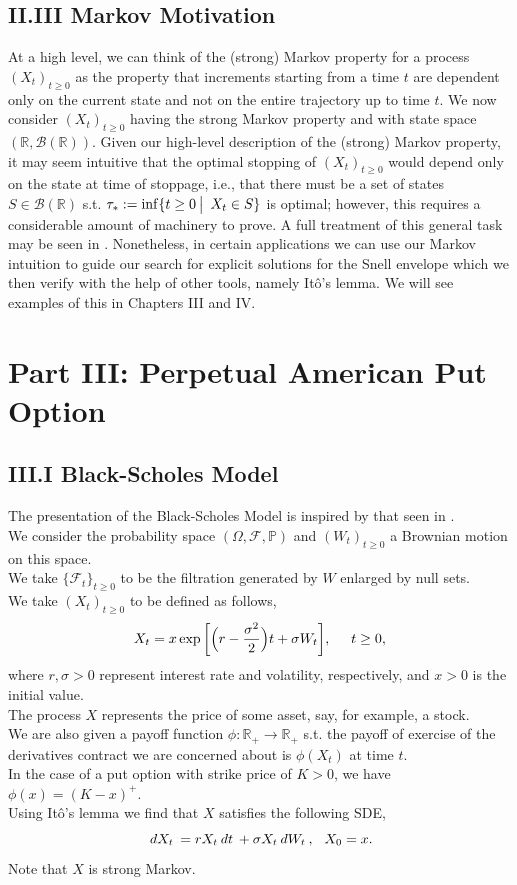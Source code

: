 \documentclass[12pt]{article}
\newcommand{\cB}{\mathcal{B}}
\newcommand{\cF}{\mathcal{F}}
\newcommand{\R}{\mathbb{R}}
\newcommand{\Prb}{\mathbb{P}}
\newcommand{\quantifyspace}{\hspace{2px} \big | \hspace{5px}}
\newcommand{\df}[1]{\hspace{2 px} d #1 \hspace{2 px}}
\newcommand{\PS}{(\Omega, \cF, \Prb)}
\newcommand{\cFi}{\{\cF_t\}_{t \geq 0}}
\newcommand{\spc}{\hspace{7 px}}
\theoremstyle{definition}
\begin{document}
\subsection*{\quad II.III Markov Motivation}\label{sec:II.III}
At a high level, we can think of the (strong) Markov property for a process $(X_t)_{t \geq 0}$ as the property that increments starting from a time $t$ are dependent only on the current state and not on the entire trajectory up to time $t$.
We now consider $(X_t)_{t \geq 0}$ having the strong Markov property and with state space $(\R, \cB(\R))$.
Given our high-level description of the (strong) Markov property, it may seem intuitive that the optimal stopping of $(X_t)_{t \geq 0}$ would depend only on the state at time of stoppage, i.e., that there must be a set of states $S \in \cB(\R)$ s.t. $\tau_* := \inf \{ t \geq 0 \quantifyspace X_t \in S \}$ is optimal;
however, this requires a considerable amount of machinery to prove.
A full treatment of this general task may be seen in \cite{shiryaev2007}.
Nonetheless, in certain applications
we can use our Markov intuition to guide our search for explicit solutions for the Snell envelope
which we then verify with the help of other tools, namely Itô's lemma.
We will see examples of this in Chapters III and IV. 

\section*{Part III: Perpetual American Put Option}\label{sec:part3}

\subsection*{\quad III.I Black-Scholes Model}\label{sec:III.I}
The presentation of the Black-Scholes Model is inspired by that seen in \cite{carmona2008}. \\
We consider the probability space $\PS$ and $(W_t)_{t \geq 0}$ a Brownian motion on this space. \\
We take $\cFi$ to be the filtration generated by $W$ enlarged by null sets. \\
We take $(X_t)_{t \geq 0}$ to be defined as follows,
\[
    X_t = x \exp \bigg [ \Big ( r - \frac{\sigma^2}{2} \Big ) t + \sigma W_t  \bigg ], \spc \spc t \geq 0,
\]
where $r, \sigma > 0$ represent interest rate and volatility, respectively, and $x > 0$ is the initial value. \\
The process $X$ represents the price of some asset, say, for example, a stock. \\
We are also given a payoff function $\phi: \R_+ \to \R_+$ s.t. the payoff of exercise of the derivatives contract we are concerned about is $\phi(X_t)$ at time $t$. \\
In the case of a put option with strike price of $K > 0$, we have $\phi(x) = (K - x)^+$. \\
Using Itô's lemma we find that $X$ satisfies the following SDE,
\[
    \df{X_t} = r X_t \df{t} + \sigma X_t \df{W_t}, \spc X_0 = x.
\]
Note that $X$ is strong Markov. \\
\end{document}
